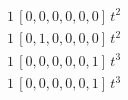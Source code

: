 \begin{align*}
1\,[0,0,0,0,0,0]\,t^{2} \\
1\,[0,1,0,0,0,0]\,t^{2} \\
1\,[0,0,0,0,0,1]\,t^{3} \\
1\,[0,0,0,0,0,1]\,t^{3}
\end{align*}
